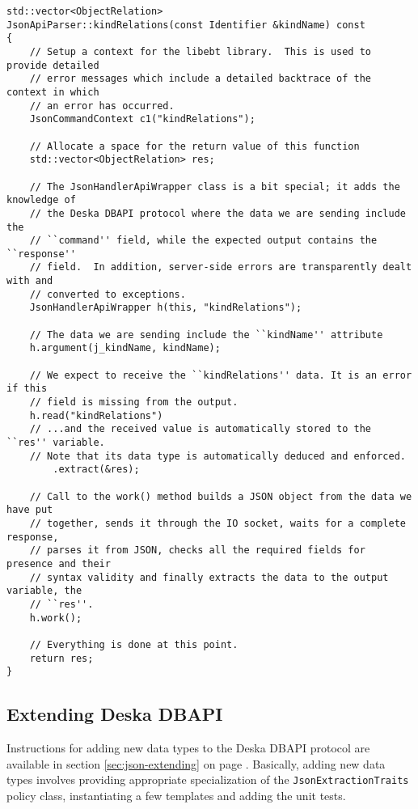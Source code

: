 \documentclass[deska]{subfiles}
\begin{document}
\begin{verbatim}
std::vector<ObjectRelation>
JsonApiParser::kindRelations(const Identifier &kindName) const
{
    // Setup a context for the libebt library.  This is used to provide detailed
    // error messages which include a detailed backtrace of the context in which
    // an error has occurred.
    JsonCommandContext c1("kindRelations");

    // Allocate a space for the return value of this function
    std::vector<ObjectRelation> res;

    // The JsonHandlerApiWrapper class is a bit special; it adds the knowledge of
    // the Deska DBAPI protocol where the data we are sending include the
    // ``command'' field, while the expected output contains the ``response''
    // field.  In addition, server-side errors are transparently dealt with and
    // converted to exceptions.
    JsonHandlerApiWrapper h(this, "kindRelations");

    // The data we are sending include the ``kindName'' attribute
    h.argument(j_kindName, kindName);

    // We expect to receive the ``kindRelations'' data. It is an error if this
    // field is missing from the output.
    h.read("kindRelations")
    // ...and the received value is automatically stored to the ``res'' variable.
    // Note that its data type is automatically deduced and enforced.
        .extract(&res);

    // Call to the work() method builds a JSON object from the data we have put
    // together, sends it through the IO socket, waits for a complete response,
    // parses it from JSON, checks all the required fields for presence and their
    // syntax validity and finally extracts the data to the output variable, the
    // ``res''.
    h.work();

    // Everything is done at this point.
    return res;
}
\end{verbatim}

\subsection{Extending Deska DBAPI}

Instructions for adding new data types to the Deska DBAPI protocol are available in section \ref{sec:json-extending} on
page \pageref{sec:json-extending}.  Basically, adding new data types involves providing appropriate specialization of
the {\tt JsonExtractionTraits} policy class, instantiating a few templates and adding the unit tests.
\end{document}
